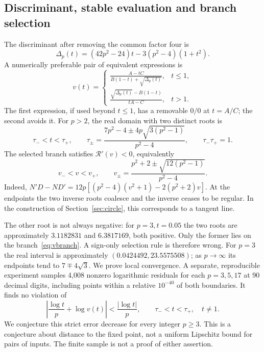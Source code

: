 \documentclass[11pt,a4paper]{article}
\theoremstyle{remark}\newtheorem{remark}[theorem]{Remark}
\begin{document}
\subsection{Discriminant, stable evaluation and branch selection}
The discriminant after removing the common factor four is
\begin{equation}\label{eq:disc}
 \Delta_p(t)=(42p^2-24)t-3(p^2-4)(1+t^2).
\end{equation}
A numerically preferable pair of equivalent expressions is
\begin{equation}\label{eq:stable}
 v(t)=\begin{cases}
 \displaystyle\frac{A-tC}{B(1-t)+\sqrt{\Delta_p(t)}},&t\le1,\\[6pt]
 \displaystyle\frac{\sqrt{\Delta_p(t)}-B(1-t)}{tA-C},&t>1.
 \end{cases}
\end{equation}
The first expression, if used beyond $t\le1$, has a removable $0/0$ at $t=A/C$; the second avoids it. For $p>2$, the real domain with two distinct roots is
\begin{equation}\label{eq:taubounds}
 \tau_-<t<\tau_+,\qquad
 \tau_\pm=\frac{7p^2-4\pm4p\sqrt{3(p^2-1)}}{p^2-4},\qquad \tau_-\tau_+=1.
\end{equation}
The selected branch satisfies $\mathcal R'(v)<0$, equivalently
\begin{equation}\label{eq:vbranch}
 v_-<v<v_+,\qquad v_\pm=\frac{p^2+2\pm\sqrt{12(p^2-1)}}{p^2-4}.
\end{equation}
Indeed, $N'D-ND'=12p[(p^2-4)(v^2+1)-2(p^2+2)v]$. At the endpoints the two inverse roots coalesce and the inverse ceases to be regular. In the construction of Section~\ref{sec:circle}, this corresponds to a tangent line.

The other root is not always negative: for $p=3,t=0.05$ the two roots are approximately $3.1182831$ and $6.3817169$, both positive. Only the former lies on the branch~\eqref{eq:vbranch}. A sign-only selection rule is therefore wrong. For $p=3$ the real interval is approximately $(0.0424492,23.5575508)$; as $p\to\infty$ its endpoints tend to $7\mp4\sqrt3$. We prove local convergence. A separate, reproducible experiment samples 4,008 nonzero logarithmic residuals for each $p=3,5,17$ at 90 decimal digits, including points within a relative $10^{-40}$ of both boundaries. It finds no violation of
\begin{equation}\label{eq:conjecture}
 \left|\frac{\log t}{p}+\log v(t)\right|<\frac{|\log t|}{p},
 \qquad \tau_-<t<\tau_+,\quad t\ne1.
\end{equation}
We conjecture this strict error decrease for every integer $p\ge3$. This is a conjecture about distance to the fixed point, not a uniform Lipschitz bound for pairs of inputs. The finite sample is not a proof of either assertion.
\end{document}
